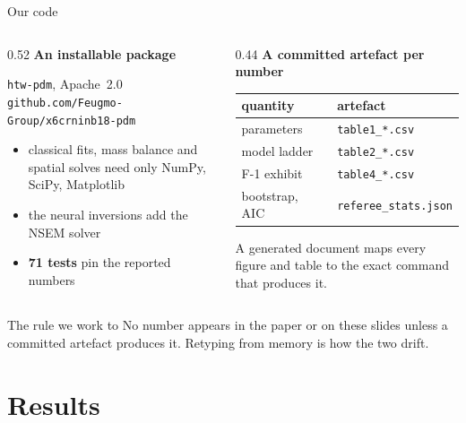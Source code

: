\documentclass[aspectratio=169,10pt]{beamer}
\begin{document}
\begin{frame}{Our code}
\begin{columns}[T]
\begin{column}{0.52\textwidth}
\textbf{An installable package}

\texttt{htw-pdm}, Apache~2.0\\
{\footnotesize\texttt{github.com/Feugmo-Group/x6crninb18-pdm}}

\vspace{0.6em}
\begin{itemize}\small
  \item classical fits, mass balance and spatial solves need only
        NumPy, SciPy, Matplotlib
  \item the neural inversions add the NSEM solver
  \item \textbf{71 tests} pin the reported numbers
\end{itemize}
\end{column}
\begin{column}{0.44\textwidth}
\textbf{A committed artefact per number}

\vspace{0.4em}
{\scriptsize
\begin{tabular}{ll}
\toprule
quantity & artefact \\
\midrule
parameters & \texttt{table1\_*.csv} \\
model ladder & \texttt{table2\_*.csv} \\
F-1 exhibit & \texttt{table4\_*.csv} \\
bootstrap, AIC & \texttt{referee\_stats.json} \\
\bottomrule
\end{tabular}}

\vspace{0.6em}
\small
A generated document maps every figure and table to the exact command
that produces it.
\end{column}
\end{columns}

\vspace{0.8em}
\begin{alertblock}{The rule we work to}
No number appears in the paper or on these slides unless a committed
artefact produces it. Retyping from memory is how the two drift.
\end{alertblock}
\end{frame}

\section{Results}
\end{document}
